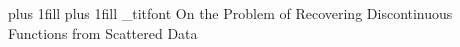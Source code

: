 
\null
\vskip2in
\bgroup
  \leftskip=0pt plus 1fill
  \rightskip=0pt plus 1fill
  \parfillskip=0pt
  \_titfont
  On the Problem of Recovering\nl
  Discontinuous Functions\nl
  from Scattered Data\par
\egroup

